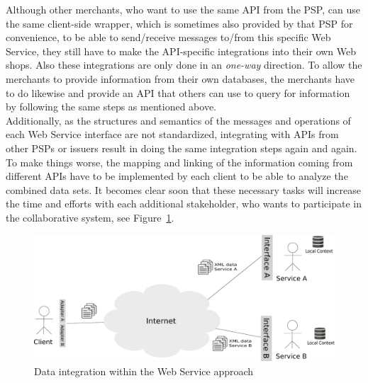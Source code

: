 Although other merchants, who want to use the same \gls{API} from the \gls{PSP}, can use the same client-side wrapper, which is sometimes also provided by that \gls{PSP} for convenience, to be able to send/receive messages to/from this specific Web Service, they still have to make the \gls{API}-specific integrations into their own Web shops. Also these integrations are only done in an \emph{one-way} direction. To allow the merchants to provide information from their own databases, the merchants have to do likewise and provide an \gls{API} that others can use to query for information by following the same steps as mentioned above. \\

Additionally, as the structures and semantics of the messages and operations of each Web Service interface are not standardized, integrating with \gls{API}s from other \gls{PSP}s or issuers result in doing the same integration steps again and again. To make things worse, the mapping and linking of the information coming from different \gls{API}s have to be implemented by each client to be able to analyze the combined data sets. It becomes clear soon that these necessary tasks will increase the time and efforts with each additional stakeholder, who wants to participate in the collaborative system, see Figure~\ref{fig:web_services_scenario}. \\

\begin{figure}[!ht]
  \centering
  \includegraphics[width=0.9\columnwidth]{images/web-services-scenario.pdf}
  \caption{Data integration within the Web Service approach}
\label{fig:web_services_scenario}
\end{figure}

